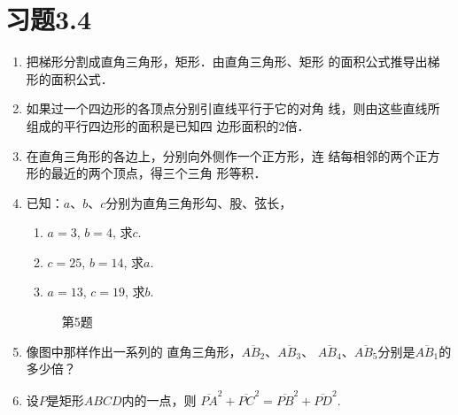 \section*{习题3.4}
\begin{enumerate}
    \item 把梯形分割成直角三角形，矩形．由直角三角形、矩形
    的面积公式推导出梯形的面积公式．
    \item 如果过一个四边形的各顶点分别引直线平行于它的对角
    线，则由这些直线所组成的平行四边形的面积是已知四
    边形面积的2倍．
    \item 在直角三角形的各边上，分别向外侧作一个正方形，连
    结每相邻的两个正方形的最近的两个顶点，得三个三角
    形等积．
    \item 已知：$a$、$b$、$c$分别为直角三角形勾、股、弦长，
    \begin{enumerate}
        \item $a=3$, $b=4$, 求$c$.
        \item $c=25$, $b=14$, 求$a$.
     \item $a=13$, $c=19$, 求$b$.
    \end{enumerate}

    \begin{figure}[htp]
    \centering
{}    
    \caption*{第5题}
\end{figure}

\item 像图中那样作出一系列的
直角三角形，$\overline{AB_2}$、$\overline{AB_3}$、
$\overline{AB_4}$、$\overline{AB_5}$分别是$\overline{AB_1}$的
多少倍？
\item 设$P$是矩形$ABCD$内的一点，则
$\overline{PA}^2+\overline{PC}^2=\overline{PB}^2+\overline{PD}^2$.


\end{enumerate}
